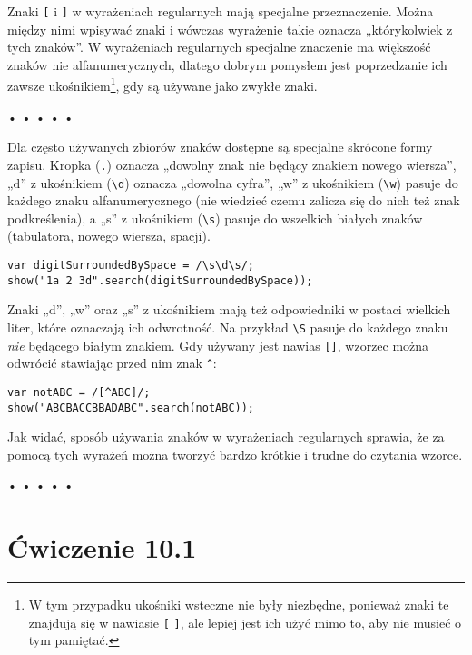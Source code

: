 Znaki \texttt{[} i \texttt{]} w wyrażeniach regularnych mają specjalne przeznaczenie. Można między nimi wpisywać znaki i wówczas wyrażenie takie oznacza „którykolwiek z tych znaków”. W wyrażeniach regularnych specjalne znaczenie ma większość znaków nie alfanumerycznych, dlatego dobrym pomysłem jest poprzedzanie ich zawsze ukośnikiem\footnote{W tym przypadku ukośniki wsteczne nie były niezbędne, ponieważ znaki te znajdują się w nawiasie \texttt{[} \texttt{]}, ale lepiej jest ich użyć mimo to, aby nie musieć o tym pamiętać.}, gdy są używane jako zwykłe znaki.



\begin{center}
• • • • •
\end{center}

  
Dla często używanych zbiorów znaków dostępne są specjalne skrócone formy zapisu. Kropka (\texttt{.}) oznacza „dowolny znak nie będący znakiem nowego wiersza”, „d” z ukośnikiem (\texttt{\textbackslash d}) oznacza „dowolna cyfra”, „w” z ukośnikiem (\texttt{\textbackslash w}) pasuje do każdego znaku alfanumerycznego (nie wiedzieć czemu zalicza się do nich też znak podkreślenia), a „s” z ukośnikiem (\texttt{\textbackslash s}) pasuje do wszelkich białych znaków (tabulatora, nowego wiersza, spacji).

  
\begin{verbatim} 
var digitSurroundedBySpace = /\s\d\s/;
show("1a 2 3d".search(digitSurroundedBySpace));
 \end{verbatim}
  
Znaki „d”, „w” oraz „s” z ukośnikiem mają też odpowiedniki w postaci wielkich liter, które oznaczają ich odwrotność. Na przykład \texttt{\textbackslash S} pasuje do każdego znaku \emph{nie} będącego białym znakiem. Gdy używany jest nawias \texttt{[]}, wzorzec można odwrócić stawiając przed nim znak \texttt{\^}:

  
\begin{verbatim} 
var notABC = /[^ABC]/;
show("ABCBACCBBADABC".search(notABC));
 \end{verbatim}
  
Jak widać, sposób używania znaków w wyrażeniach regularnych sprawia, że za pomocą tych wyrażeń można tworzyć bardzo krótkie i trudne do czytania wzorce.



\begin{center}
• • • • •
\end{center}

  
\section*{Ćwiczenie 10.1}
\label{sec:10.1}
  
